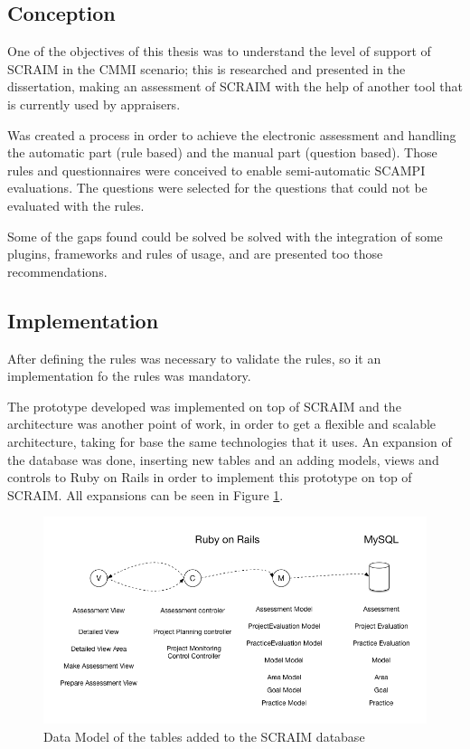 \documentclass[9pt,a4paper]{extarticle}
\begin{document}
\begin{multicols}{2}
\subsection{Conception}
One of the objectives of this thesis was to understand the level of support of SCRAIM in the CMMI scenario; this is researched and presented in the dissertation, making an assessment of SCRAIM with the help of another tool that is currently used by appraisers.

Was created a process in order to achieve the electronic assessment and handling the automatic part (rule based) and the manual part (question based). Those rules and questionnaires were conceived to enable semi-automatic SCAMPI evaluations.
The questions were selected for the questions that could not be evaluated with the rules.

Some of the gaps found could be solved be solved with the integration of some plugins, frameworks and rules of usage, and are presented too those recommendations.

\subsection{Implementation}

After defining the rules was necessary to validate the rules, so it an implementation fo the rules was mandatory.

The prototype developed was implemented on top of SCRAIM and the architecture was another point of work, in order to get a flexible and scalable architecture, taking for base the same technologies that it uses.
An  expansion of the database was done, inserting new tables and an adding models, views and controls to Ruby on Rails in order to implement this prototype on top of SCRAIM. All expansions can be seen in  Figure \ref{fig:figura}.

\begin{figure}[H]
	\centerline{\includegraphics[scale=.3]{presentation.png}}
	\caption{Data Model of the tables added to the SCRAIM database}  
	\label{fig:figura}
\end{figure}




\end{multicols}
\end{document}
